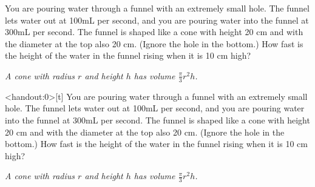 \begin{frame}[t]
\MoreSpace\AnswerYes
You are pouring water through a funnel with an extremely small hole. The funnel lets water out at \textcolor{C3}{100mL per second}, and you are pouring water into the funnel at \textcolor{C3}{300mL per second}. The funnel is shaped like a cone with height \textcolor{C3}{ 20 cm} and with the diameter at the top also \textcolor{C3}{ 20 cm}. (Ignore the hole in the bottom.) How fast is the height of the water in the funnel rising when it is \textcolor{C3}{10 cm}  high?\vfill

\textit{A cone with radius $r$ and height $h$ has volume $\frac{\pi}{3}r^2h$.}
\end{frame}
\begin{frame}<handout:0>[t]\footnotesize
{}\AnswerYes
You are pouring water through a funnel with an extremely small hole. The funnel lets water out at \textcolor{C3}{100mL per second}, and you are pouring water into the funnel at \textcolor{C3}{300mL per second}. The funnel is shaped like a cone with height \textcolor{C3}{ 20 cm} and with the diameter at the top also \textcolor{C3}{ 20 cm}. (Ignore the hole in the bottom.) How fast is the height of the water in the funnel rising when it is \textcolor{C3}{10 cm}  high?

\textit{A cone with radius $r$ and height $h$ has volume $\frac{\pi}{3}r^2h$.}
\end{frame}
